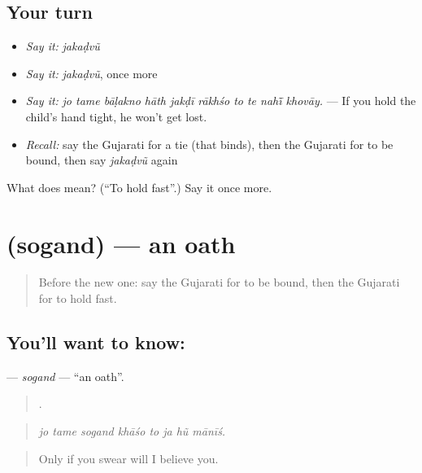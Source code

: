 \subsection*{Your turn}
\begin{itemize}
\raggedright
  \item \emph{Say it:} \emph{jakaḍvũ}
  \item \emph{Say it:} \emph{jakaḍvũ}, once more
  \item \emph{Say it:} \emph{jo tame bāḷakno hāth jakḍī rākhśo to te nahī̃ khovāy.} — If you hold the child's hand tight, he won't get lost.
  \item \emph{Recall:} say the Gujarati for a tie (that binds), then the Gujarati for to be bound, then say \emph{jakaḍvũ} again
\end{itemize}

\begin{tcolorbox}[breakable,colback=teal!4,colframe=teal!35!black,title={Before you move on}]
What does  mean? (\textquotedblleft{}To hold fast\textquotedblright{}.) Say it once more.
\end{tcolorbox}
\section[\texorpdfstring{\gu{સોગંદ} (sogand)}{સોગંદ (sogand)}]{ (sogand) — an oath}

\label{lesson:GU-C540-sogand}



\begin{quote}
Before the new one: say the Gujarati for to be bound, then the Gujarati for to hold fast.
\end{quote}

\subsection*{You'll want to know: }
\textbf{} — \emph{sogand} — \textquotedblleft{}an oath\textquotedblright{}.

\begin{quote}
       .
\end{quote}

\begin{quote}
\emph{jo tame sogand khāśo to ja hũ mānīś.}
\end{quote}

\begin{quote}
Only if you swear will I believe you.
\end{quote}


